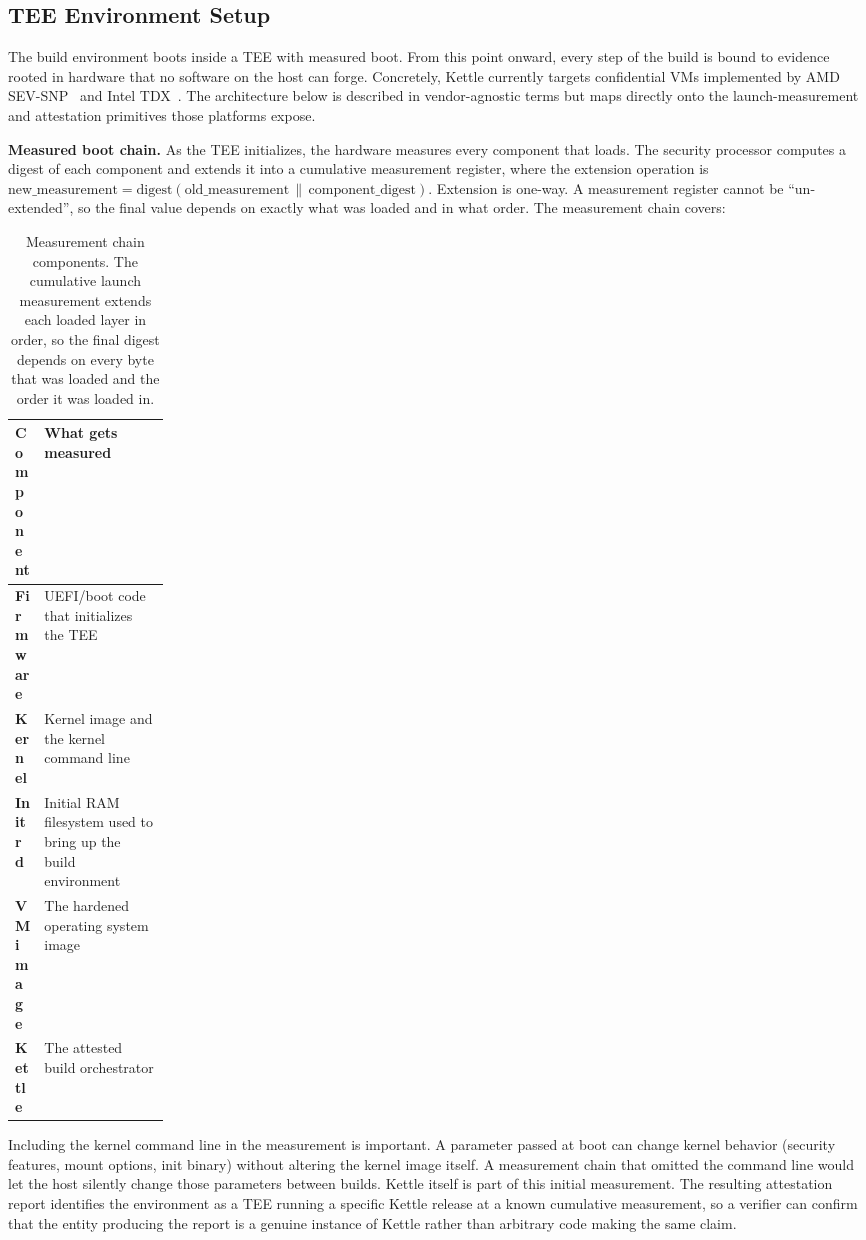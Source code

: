 \documentclass[11pt]{article}
\begin{document}
\subsection{TEE Environment Setup}
\label{sec:tee-setup}

The build environment boots inside a TEE with measured boot. From this point onward, every step of the build is bound to evidence rooted in hardware that no software on the host can forge. Concretely, Kettle currently targets confidential VMs implemented by AMD SEV-SNP~\cite{ref:amd-snp} and Intel TDX~\cite{ref:intel-tdx}. The architecture below is described in vendor-agnostic terms but maps directly onto the launch-measurement and attestation primitives those platforms expose.

\textbf{Measured boot chain.} As the TEE initializes, the hardware measures every component that loads. The security processor computes a digest of each component and extends it into a cumulative measurement register, where the extension operation is $\mathrm{new\_measurement} = \mathrm{digest}(\mathrm{old\_measurement} \,\|\, \mathrm{component\_digest})$. Extension is one-way. A measurement register cannot be ``un-extended'', so the final value depends on exactly what was loaded and in what order. The measurement chain covers:

\begin{table}[H]
\centering
\small
\begin{tabularx}{\linewidth}{@{} >{\bfseries}p{0.18\linewidth} X @{}}
\toprule
Component & What gets measured \\
\midrule
Firmware & UEFI/boot code that initializes the TEE \\
Kernel & Kernel image and the kernel command line \\
Initrd & Initial RAM filesystem used to bring up the build environment \\
VM image & The hardened operating system image \\
Kettle & The attested build orchestrator \\
\bottomrule
\end{tabularx}
\caption{Measurement chain components. The cumulative launch measurement extends each loaded layer in order, so the final digest depends on every byte that was loaded and the order it was loaded in.}
\end{table}

Including the kernel command line in the measurement is important. A parameter passed at boot can change kernel behavior (security features, mount options, init binary) without altering the kernel image itself. A measurement chain that omitted the command line would let the host silently change those parameters between builds. Kettle itself is part of this initial measurement. The resulting attestation report identifies the environment as a TEE running a specific Kettle release at a known cumulative measurement, so a verifier can confirm that the entity producing the report is a genuine instance of Kettle rather than arbitrary code making the same claim.
\end{document}
